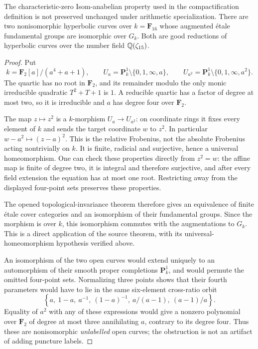 \begin{proposition}\label{A6-frobenius-counterexample}
The characteristic-zero Isom-anabelian property used in the
compactification definition is not preserved unchanged under arithmetic
specialization. There are two nonisomorphic hyperbolic curves over
$k=\mathbf F_{16}$ whose augmented \'etale fundamental groups are
isomorphic over $G_k$. Both are good reductions of hyperbolic curves
over the number field ${\mathbb{Q}}(\zeta_{15})$.
\end{proposition}
\begin{proof}
Put
\[
 k=\mathbf F_2[a]/(a^4+a+1),\qquad
 U_a=\mathbf P^1_k\setminus\{0,1,\infty,a\},\qquad
 U_{a^2}=\mathbf P^1_k\setminus\{0,1,\infty,a^2\}.
\]
The quartic has no root in $\mathbf F_2$, and its remainder modulo
the only monic irreducible quadratic $T^2+T+1$ is $1$.
A reducible quartic has a factor of degree at most two, so it is
irreducible and $a$ has degree four over $\mathbf F_2$.

The map $z\mapsto z^2$ is a $k$-morphism $U_a\to U_{a^2}$:
on coordinate rings it fixes every element of $k$ and sends the
target coordinate $w$ to $z^2$. In particular
$w-a^2\mapsto(z-a)^2$. This is the relative Frobenius, not the
absolute Frobenius acting nontrivially on $k$. It is finite, radicial
and surjective, hence a universal homeomorphism. One can check these
properties directly from $z^2=w$: the affine map is finite of degree
two, it is integral and therefore surjective, and after every field
extension the equation has at most one root. Restricting away from
the displayed four-point sets preserves these properties.

The opened topological-invariance theorem
\cite[Proposition~58.8.4, Tag~0BQN]{A6StacksUniversalHomeomorphism}
therefore gives an equivalence of finite \'etale cover categories
and an isomorphism of their fundamental groups. Since the morphism
is over $k$, this isomorphism commutes with the augmentations to
$G_k$. This is a direct application of the source theorem, with its
universal-homeomorphism hypothesis verified above.

An isomorphism of the two open curves would extend uniquely to an
automorphism of their smooth proper completions $\mathbf P^1_k$,
and would permute the omitted four-point sets. Normalizing three
points shows that their fourth parameters would have to lie in the
same six-element cross-ratio orbit
\[
 \left\{a,\ 1-a,\ a^{-1},\ (1-a)^{-1},\
              a/(a-1),\ (a-1)/a\right\}.
\]
Equality of $a^2$ with any of these expressions would give a nonzero
polynomial over $\mathbf F_2$ of degree at most three annihilating
$a$, contrary to its degree four. Thus these are nonisomorphic
\emph{unlabelled} open curves; the obstruction is not an artifact of
adding puncture labels.


\end{proof}
